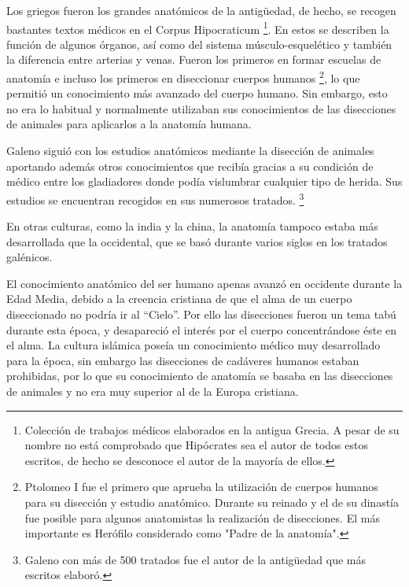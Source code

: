 Los griegos fueron los grandes anatómicos de la antigüedad, de hecho, se recogen bastantes textos médicos en el Corpus Hipocraticum \footnote{Colección de trabajos médicos elaborados en la antigua Grecia. A pesar de su nombre no está comprobado que Hipócrates sea el autor de todos estos escritos, de hecho se desconoce el autor de la mayoría de ellos.}. En estos se describen la función de algunos órganos, así como del sistema músculo-esquelético y también la diferencia entre arterias y venas. Fueron los primeros en formar escuelas de anatomía e incluso los primeros en diseccionar cuerpos humanos \footnote{Ptolomeo I fue el primero que aprueba la utilización de cuerpos humanos para su disección y estudio anatómico. Durante su reinado y el de su dinastía fue posible para algunos anatomistas la realización de disecciones. El más importante es Herófilo considerado como "Padre de la anatomía".}, lo que permitió un conocimiento más avanzado del cuerpo humano. Sin embargo, esto no era lo habitual y normalmente utilizaban sus conocimientos de las disecciones de animales para aplicarlos a la anatomía humana.

Galeno siguió con los estudios anatómicos mediante la disección de animales aportando además otros conocimientos que recibía gracias a su condición de médico entre los gladiadores donde podía vislumbrar cualquier tipo de herida. Sus estudios se encuentran recogidos en sus numerosos tratados. \footnote{Galeno con más de 500 tratados fue el autor de la antigüedad que más escritos elaboró.}

En otras culturas, como la india y la china, la anatomía tampoco estaba más desarrollada que la occidental, que se basó durante varios siglos en los tratados galénicos.

El conocimiento anatómico del ser humano apenas avanzó en occidente durante la Edad Media, debido a la creencia cristiana de que el alma de un cuerpo diseccionado no podría ir al ``Cielo''. Por ello las disecciones fueron un tema tabú durante esta época, y desapareció el interés por el cuerpo concentrándose éste en el alma. La cultura islámica poseía un conocimiento médico muy desarrollado para la época, sin embargo las disecciones de cadáveres humanos estaban prohibidas, por lo que su conocimiento de anatomía se basaba en las disecciones de animales y no era muy superior al de la Europa cristiana.


